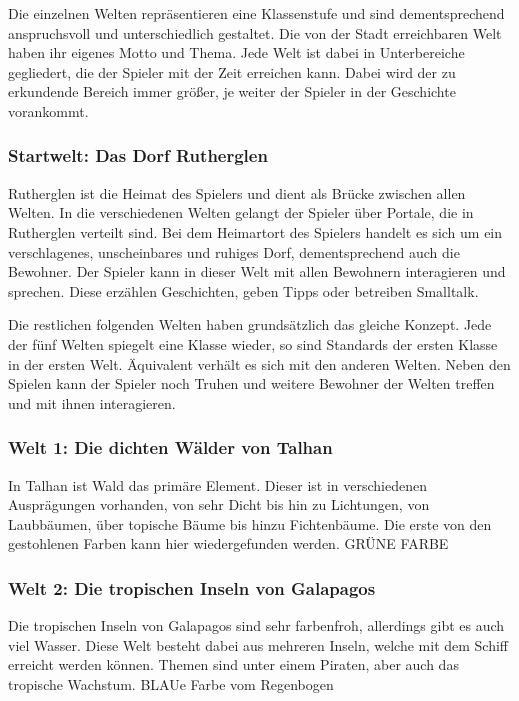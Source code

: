 Die einzelnen Welten repräsentieren eine Klassenstufe und sind dementsprechend anspruchsvoll und unterschiedlich gestaltet. Die von der Stadt erreichbaren Welt haben ihr eigenes Motto und Thema. Jede Welt ist dabei in Unterbereiche gegliedert, die der Spieler mit der Zeit erreichen kann. Dabei wird der zu erkundende Bereich immer größer, je weiter der Spieler in der Geschichte vorankommt. 

\subsubsection{Startwelt: Das Dorf Rutherglen}
	Rutherglen ist die Heimat des Spielers und dient als Brücke zwischen allen Welten. In die verschiedenen Welten gelangt der Spieler über Portale, die in Rutherglen verteilt sind. Bei dem Heimartort des Spielers handelt es sich um ein verschlagenes, unscheinbares und ruhiges Dorf, dementsprechend auch die Bewohner. Der Spieler kann in dieser Welt mit allen Bewohnern interagieren und sprechen. Diese erzählen Geschichten, geben Tipps oder betreiben Smalltalk.
	
	Die restlichen folgenden Welten haben grundsätzlich das gleiche Konzept. Jede der fünf Welten spiegelt eine Klasse wieder, so sind Standards der ersten Klasse in der ersten Welt. Äquivalent verhält es sich mit den anderen Welten. Neben den Spielen kann der Spieler noch Truhen und weitere Bewohner der Welten treffen und mit ihnen interagieren.
	
\subsubsection{Welt 1: Die dichten Wälder von Talhan}
	In Talhan ist Wald das primäre Element. Dieser ist in verschiedenen Ausprägungen vorhanden, von sehr Dicht bis hin zu Lichtungen, von Laubbäumen, über topische Bäume bis hinzu Fichtenbäume. Die erste von den gestohlenen Farben kann hier wiedergefunden werden. GRÜNE FARBE
	
\subsubsection{Welt 2: Die tropischen Inseln von Galapagos}
	Die tropischen Inseln von Galapagos sind sehr farbenfroh, allerdings gibt es auch viel Wasser. Diese Welt besteht dabei aus mehreren Inseln, welche mit dem Schiff erreicht werden können. Themen sind unter einem Piraten, aber auch das tropische Wachstum. BLAUe Farbe vom Regenbogen
	
